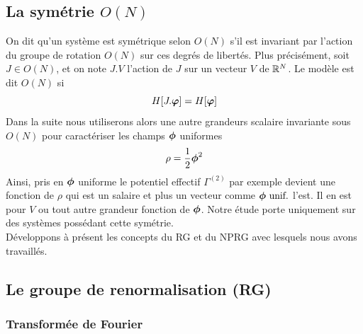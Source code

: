 \documentclass[10pt]{article}
\begin{document}
\begin{multicols}{2}
\subsection{La symétrie $O(N)$}

\label{sec:ON}

On dit qu'un système est symétrique selon $O(N)$ s'il est invariant par l'action du groupe de rotation $O(N)$ sur ces degrés de libertés. Plus précisément, soit $J \in O(N)$, et on note $J.V$ l'action de $J$ sur un vecteur $V$ de $\mathbb{R}^N$. Le modèle est dit $O(N)$ si 
\begin{equation}
	H[J .\boldsymbol{ \varphi}] = H[\boldsymbol{ \varphi}]	
\end{equation}
Dans la suite nous utiliserons alors une autre grandeurs scalaire invariante sous $O(N)$ pour caractériser les champs $\boldsymbol{ \phi}$ uniformes 
\begin{equation}
	\rho = \frac{1}{2}  \boldsymbol{ \phi}^2  
\end{equation}
Ainsi, pris en $\boldsymbol{ \phi}$ uniforme le potentiel effectif $\Gamma^{(2)}$ par exemple devient une fonction de $\rho$ qui est un salaire et plus un vecteur comme $\boldsymbol{ \phi} \text{ unif.}$ l'est. Il en est pour $V$ ou tout autre grandeur fonction de $\boldsymbol{ \phi}$. Notre étude porte uniquement sur des systèmes possédant cette symétrie.\\

Développons à présent les concepts du RG et du NPRG avec lesquels nous avons travaillés.



\vspace*{11pt}
\subsection{Le groupe de renormalisation (RG)}


\subsubsection{Transformée de Fourier}

\label{sec:TF}


\end{multicols}
\end{document}
